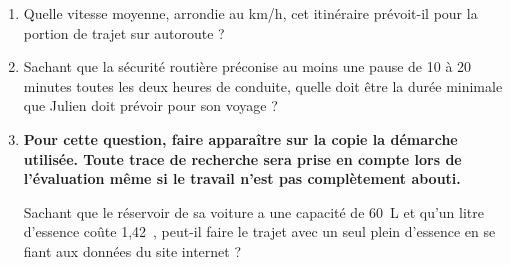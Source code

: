 \documentclass[10pt]{article}
\newcommand{\euro}{\eurologo{}}
\begin{document}
\begin{enumerate}
\item Quelle vitesse moyenne, arrondie au km/h, cet itinéraire prévoit-il pour la portion de trajet sur autoroute ? 
\item Sachant que la sécurité routière préconise au moins une pause de 10 à 20 minutes toutes les deux heures de conduite, quelle doit être la durée minimale que Julien doit prévoir pour son voyage ? 

\medskip

 
\item \textbf{Pour cette question, faire apparaître sur la copie la démarche utilisée. Toute trace de recherche sera prise en compte lors de l'évaluation même si le travail n'est pas complètement abouti.}

Sachant que le réservoir de sa voiture a une capacité de 60~L et qu'un litre d'essence coûte 1,42~\euro, peut-il faire le trajet avec un seul plein d'essence en se fiant aux données du site internet ?
\end{enumerate}
 
\vspace{0,5cm}
\end{document}
